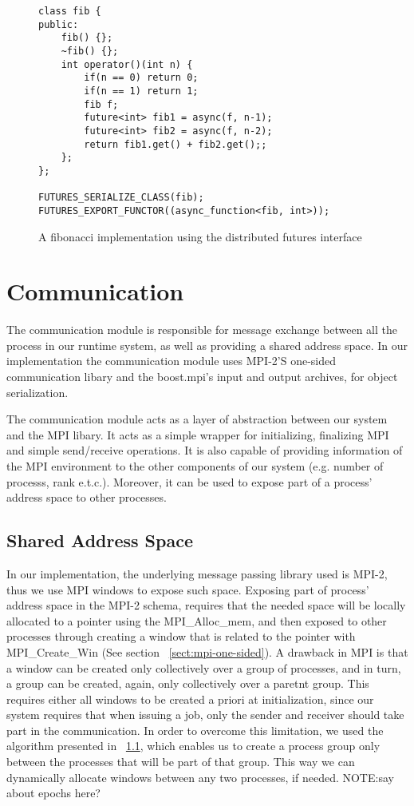 \begin{figure}[here]
\begin{lstlisting}
class fib {
public:
	fib() {};
	~fib() {};
	int	operator()(int n) {
		if(n == 0) return 0;
		if(n == 1) return 1;
		fib f;
		future<int> fib1 = async(f, n-1);
		future<int> fib2 = async(f, n-2);
		return fib1.get() + fib2.get();;
	};
};

FUTURES_SERIALIZE_CLASS(fib);
FUTURES_EXPORT_FUNCTOR((async_function<fib, int>));

\end{lstlisting}
\caption{A fibonacci implementation using the distributed futures interface}
\label{lst:fib}
\end{figure}




\section{Communication}
The communication module is responsible for message exchange between all the process in our runtime system,
as well as providing a shared address space.
In our implementation the communication module uses MPI-2'S one-sided communication libary and the boost.mpi's
input and output archives, for object serialization. 

The communication module acts as a layer of abstraction between our system and the MPI libary.  It acts as
a simple wrapper for initializing, finalizing MPI and simple send/receive operations.
It is also capable of providing information of the MPI environment to the other components of our system (e.g.
number of processs, rank e.t.c.).  Moreover, it can be used to expose part of a process' address space to other 
processes.  

\subsection{Shared Address Space}
In our implementation, the underlying message passing library used is MPI-2, thus we use MPI windows to
expose such space.  Exposing part of process' address space in the MPI-2 schema, requires that the needed
space will be locally allocated to a pointer using the MPI\_Alloc\_mem, and then exposed to other processes
through creating a window that is related to the pointer with MPI\_Create\_Win 
(See section ~\ref{sect:mpi-one-sided}). 
A drawback in MPI is that a window can be created only collectively over a group of processes,
and in turn, a group can be created, again, only collectively over a paretnt group. 
This requires either all windows to be created a priori at initialization, since our system requires that when
issuing a job, only the sender and receiver should take part in the communication.  
In order to overcome this limitation, we used the algorithm presented in ~\ref{}, which
enables us to create a process group only between the processes that will be part of that group.  This way we 
can dynamically allocate windows between any two processes, if needed.
NOTE:say about epochs here?


